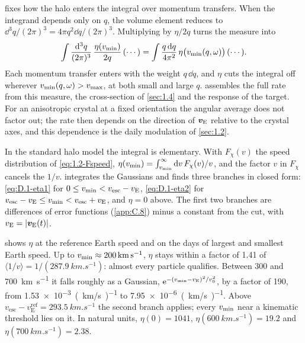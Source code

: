  fixes how the halo enters the integral over momentum transfers. When the integrand depends only on $q$, the volume element reduces to $\dd^3q/(2\pi)^3 = 4\pi q^2\dd q/(2\pi)^3$. Multiplying by $\eta/2q$ turns the measure into~\cites[Eq.~(11)]{kahn2022searches}[Eq.~(A.14)]{essig2016direct}
\begin{equation*}
  \int\frac{\mathrm{d}^3 q}{(2\pi)^3}\,\frac{\eta(v_{\mathrm{min}})}{2q}\,(\cdots) = \int\frac{q\,\mathrm{d} q}{4\pi^2}\,\eta\bigl(v_{\mathrm{min}}(q, \omega)\bigr)\,(\cdots).
\end{equation*}
Each momentum transfer enters with the weight $q\,\dd q$, and $\eta$ cuts the integral off wherever $v_{\mathrm{min}}(q, \omega) > v_{\mathrm{max}}$, at both small and large $q$.  assembles the full rate from this measure, the cross-section of \cref{sec:1.4} and the response of the target. For an anisotropic crystal at a fixed orientation the angular average does not factor out; the rate then depends on the direction of $\bm{v}_{\mathrm{E}}$ relative to the crystal axes, and this dependence is the daily modulation of \cref{sec:1.2}.

In the standard halo model the integral is elementary. With $F_\chi(v)$ the speed distribution of \cref{eq:1.2-Fspeed}, $\eta(v_{\mathrm{min}}) = \int_{v_{\mathrm{min}}}^\infty \mathrm{d} v\, F_\chi(v)/v$, and the factor $v$ in $F_\chi$ cancels the $1/v$.  integrates the Gaussians and finds three branches in closed form: \cref{eq:D.1-eta1} for $0 \le v_{\mathrm{min}} < v_{\mathrm{esc}} - v_{\mathrm{E}}$, \cref{eq:D.1-eta2} for $v_{\mathrm{esc}} - v_{\mathrm{E}} \le v_{\mathrm{min}} < v_{\mathrm{esc}} + v_{\mathrm{E}}$, and $\eta = 0$ above. The first two branches are differences of error functions (\cref{app:C.8}) minus a constant from the cut, with $v_{\mathrm{E}} = |\bm{v}_{\mathrm{E}}(t)|$.

 shows $\eta$ at the reference Earth speed and on the days of largest and smallest Earth speed. Up to $v_{\mathrm{min}} \approx \SI{200}{km.s^{-1}}$, $\eta$ stays within a factor of 1.41 of $\langle 1/v\rangle = 1/(\SI{287.9}{km.s^{-1}})$: almost every particle qualifies. Between 300 and \SI{700}{km.s^{-1}} it falls roughly as a Gaussian, $\mathrm{e}^{-(v_{\mathrm{min}} - v_{\mathrm{E}})^2/v_0^2}$, by a factor of 190, from \SI{1.53e-3}{(km/s)^{-1}} to \SI{7.95e-6}{(km/s)^{-1}}. Above $v_{\mathrm{esc}} - v_{\mathrm{E}}^{\mathrm{ref}} = \SI{293.5}{km.s^{-1}}$ the second branch applies; every $v_{\mathrm{min}}$ near a kinematic threshold lies on it. In natural units, $\eta(0) = 1041$, $\eta(\SI{600}{km.s^{-1}}) = 19.2$ and $\eta(\SI{700}{km.s^{-1}}) = 2.38$.

